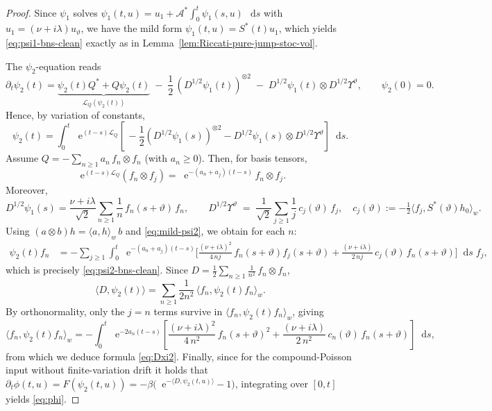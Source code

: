 \documentclass[10pt,a4paper,reqno]{amsart}
\newcommand*\D{\mathop{}\!\mathrm{d}}
\newcommand*\E{\mathop{}\!\mathrm{e}}
\numberwithin{equation}{section}
\theoremstyle{plain}
\theoremstyle{definition}
\theoremstyle{example}
\newcommand{\cA}{\mathcal{A}}
\begin{document}
\begin{proof}
Since $\psi_1$ solves $\psi_1(t,u)=u_1+\cA^*\int_0^t \psi_1(s,u)\,\D s$ with $u_1=(\nu+i\lambda)u_\vartheta$,
we have the mild form $\psi_1(t,u)=S^*(t)u_1$, which yields \eqref{eq:psi1-bns-clean} exactly as in Lemma~\ref{lem:Riccati-pure-jump-stoc-vol}.

The $\psi_2$-equation reads
$$
  \partial_t\psi_2(t)
  = \underbrace{\psi_2(t)Q^*+Q\psi_2(t)}_{\mathcal L_Q(\psi_2(t))}
        \;-\;\frac{1}{2}\,(D^{1/2}\psi_1(t))^{\otimes 2}
        \;-\; D^{1/2}\psi_1(t)\otimes D^{1/2}\Upsilon^\vartheta,
  \qquad \psi_2(0)=0.
$$
Hence, by variation of constants,
\begin{equation}\label{eq:mild-psi2}
  \psi_2(t)
  = \int_0^t \E^{(t-s)\mathcal L_Q}\left[\,
           -\frac{1}{2}(D^{1/2}\psi_1(s))^{\otimes 2}
           - D^{1/2}\psi_1(s)\otimes D^{1/2}\Upsilon^\vartheta
        \right]\D s.
\end{equation}
Assume $Q=-\sum_{n\ge1} a_n\, f_n\otimes f_n$ (with $a_n\geq 0$). Then, for basis tensors,
$$
  \E^{(t-s)\mathcal L_Q}(f_n\otimes f_j) = \E^{-(a_n+a_j)(t-s)}\,f_n\otimes f_j.
$$
Moreover,
$$
  D^{1/2}\psi_1(s)
  = \frac{\nu+i\lambda}{\sqrt 2}\sum_{n\geq 1}\frac{1}{n}\,f_n(s+\vartheta)\,f_n,
  \qquad
  D^{1/2}\Upsilon^\vartheta \;=\; \frac{1}{\sqrt 2}\sum_{j\geq 1}\frac{1}{j}\,c_j(\vartheta)\,f_j,
  \quad c_j(\vartheta):=-\tfrac12\langle f_j,S^*(\vartheta)h_0\rangle_w.
$$
Using $(a\otimes b)h=\langle a,h\rangle_w\,b$ and \eqref{eq:mild-psi2}, we obtain for each $n$:
\begin{align*}
  \psi_2(t)f_n
  &= -\!\sum_{j\ge1}\!\int_0^t \E^{-(a_n+a_j)(t-s)}
     \Big[\frac{(\nu+i\lambda)^2}{4\,n j}\,f_n(s+\vartheta)f_j(s+\vartheta)
          +\frac{(\nu+i\lambda)}{2\,n j}\,c_j(\vartheta)\,f_n(s+\vartheta)\Big]\D s\; f_j,
\end{align*}
which is precisely \eqref{eq:psi2-bns-clean}. Since $D=\frac12\sum_{n\ge1}\frac{1}{n^2}\,f_n\otimes f_n$,
$$
  \langle D,\psi_2(t)\rangle
  = \sum_{n\ge1}\frac{1}{2n^2}\,\langle f_n,\psi_2(t)f_n\rangle_w.
$$
By orthonormality, only the $j=n$ terms survive in $\langle f_n,\psi_2(t)f_n\rangle_w$, giving
$$
  \langle f_n,\psi_2(t)f_n\rangle_w
  = -\int_0^t \E^{-2a_n(t-s)}
      \left[\frac{(\nu+i\lambda)^2}{4\,n^2}\,f_n(s+\vartheta)^2
           +\frac{(\nu+i\lambda)}{2\,n^2}\,c_n(\vartheta)\,f_n(s+\vartheta)\right]\D s,
$$
from which we deduce formula \eqref{eq:Dxi2}.
Finally, since for the compound-Poisson input without finite-variation drift it holds that
$\partial_t\phi(t,u)=F(\psi_2(t,u))=-\beta\big(\E^{-\langle D,\psi_2(t,u)\rangle}-1\big)$,
integrating over $[0,t]$ yields \eqref{eq:phi}.
\end{proof}
\end{document}
